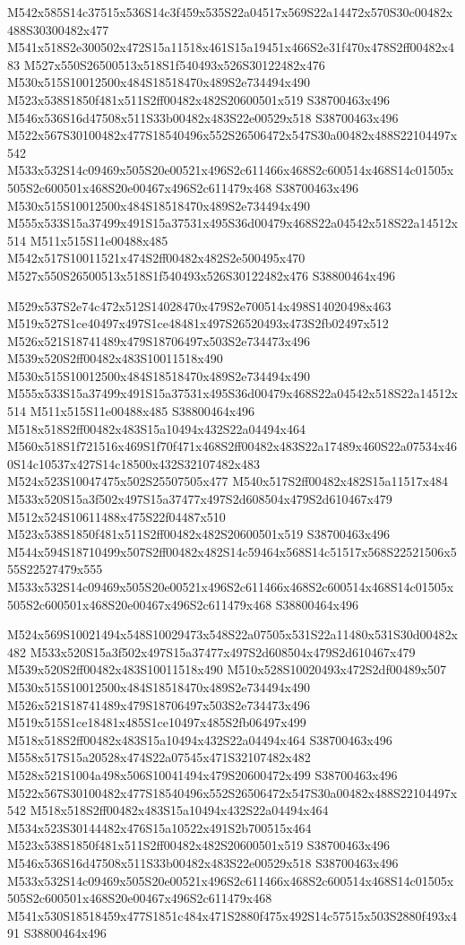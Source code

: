 \documentclass{article}
\begin{document}
\begin{multicols}{2}
M542x585S14c37515x536S14c3f459x535S22a04517x569S22a14472x570S30c00482x488S30300482x477 M541x518S2e300502x472S15a11518x461S15a19451x466S2e31f470x478S2ff00482x483 M527x550S26500513x518S1f540493x526S30122482x476 M530x515S10012500x484S18518470x489S2e734494x490 M523x538S1850f481x511S2ff00482x482S20600501x519 S38700463x496 M546x536S16d47508x511S33b00482x483S22e00529x518 S38700463x496 M522x567S30100482x477S18540496x552S26506472x547S30a00482x488S22104497x542 M533x532S14c09469x505S20e00521x496S2c611466x468S2c600514x468S14c01505x505S2c600501x468S20e00467x496S2c611479x468 S38700463x496 M530x515S10012500x484S18518470x489S2e734494x490 M555x533S15a37499x491S15a37531x495S36d00479x468S22a04542x518S22a14512x514 M511x515S11e00488x485 M542x517S10011521x474S2ff00482x482S2e500495x470 M527x550S26500513x518S1f540493x526S30122482x476 S38800464x496

M529x537S2e74c472x512S14028470x479S2e700514x498S14020498x463 M519x527S1ce40497x497S1ce48481x497S26520493x473S2fb02497x512 M526x521S18741489x479S18706497x503S2e734473x496 M539x520S2ff00482x483S10011518x490 M530x515S10012500x484S18518470x489S2e734494x490 M555x533S15a37499x491S15a37531x495S36d00479x468S22a04542x518S22a14512x514 M511x515S11e00488x485 S38800464x496 M518x518S2ff00482x483S15a10494x432S22a04494x464 M560x518S1f721516x469S1f70f471x468S2ff00482x483S22a17489x460S22a07534x460S14c10537x427S14c18500x432S32107482x483 M524x523S10047475x502S25507505x477 M540x517S2ff00482x482S15a11517x484 M533x520S15a3f502x497S15a37477x497S2d608504x479S2d610467x479 M512x524S10611488x475S22f04487x510 M523x538S1850f481x511S2ff00482x482S20600501x519 S38700463x496 M544x594S18710499x507S2ff00482x482S14c59464x568S14c51517x568S22521506x555S22527479x555 M533x532S14c09469x505S20e00521x496S2c611466x468S2c600514x468S14c01505x505S2c600501x468S20e00467x496S2c611479x468 S38800464x496

M524x569S10021494x548S10029473x548S22a07505x531S22a11480x531S30d00482x482 M533x520S15a3f502x497S15a37477x497S2d608504x479S2d610467x479 M539x520S2ff00482x483S10011518x490 M510x528S10020493x472S2df00489x507 M530x515S10012500x484S18518470x489S2e734494x490 M526x521S18741489x479S18706497x503S2e734473x496 M519x515S1ce18481x485S1ce10497x485S2fb06497x499 M518x518S2ff00482x483S15a10494x432S22a04494x464 S38700463x496 M558x517S15a20528x474S22a07545x471S32107482x482 M528x521S1004a498x506S10041494x479S20600472x499 S38700463x496 M522x567S30100482x477S18540496x552S26506472x547S30a00482x488S22104497x542 M518x518S2ff00482x483S15a10494x432S22a04494x464 M534x523S30144482x476S15a10522x491S2b700515x464 M523x538S1850f481x511S2ff00482x482S20600501x519 S38700463x496 M546x536S16d47508x511S33b00482x483S22e00529x518 S38700463x496 M533x532S14c09469x505S20e00521x496S2c611466x468S2c600514x468S14c01505x505S2c600501x468S20e00467x496S2c611479x468 M541x530S18518459x477S1851c484x471S2880f475x492S14c57515x503S2880f493x491 S38800464x496


\end{multicols}
\end{document}
